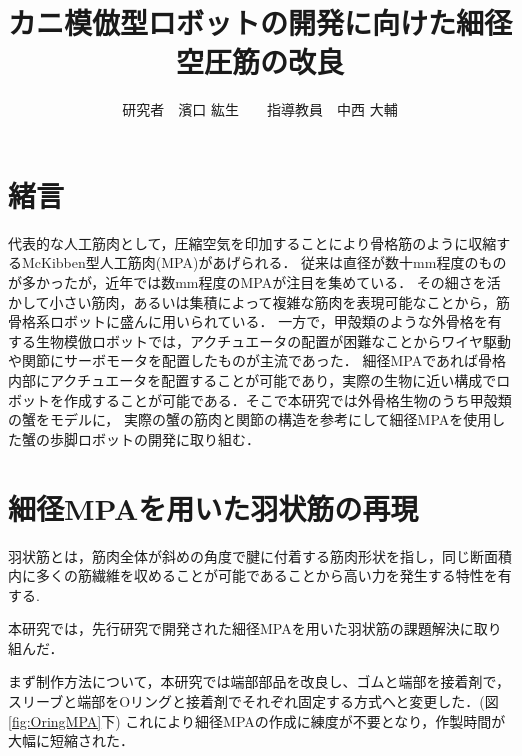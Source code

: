 \documentclass{jarticle}
\begin{document}

\title{
カニ模倣型ロボットの開発に向けた細径空圧筋の改良
}
\author{
\centering
研究者　濱口 紘生　　指導教員　中西 大輔
}

\maketitle

\thispagestyle{empty}  %

\section{緒言}

代表的な人工筋肉として，圧縮空気を印加することにより骨格筋のように収縮するMcKibben型人工筋肉(MPA)があげられる．
従来は直径が数十mm程度のものが多かったが，近年では数mm程度のMPAが注目を集めている\cite{wakimoto}．
その細さを活かして小さい筋肉，あるいは集積によって複雑な筋肉を表現可能なことから，筋骨格系ロボットに盛んに用いられている\cite{wakimoto}．
一方で，甲殻類のような外骨格を有する生物模倣ロボットでは，アクチュエータの配置が困難なことからワイヤ駆動や関節にサーボモータを配置したものが主流であった\cite{crabrobot1}．
細径MPAであれば骨格内部にアクチュエータを配置することが可能であり，実際の生物に近い構成でロボットを作成することが可能である．そこで本研究では外骨格生物のうち甲殻類の蟹をモデルに，
実際の蟹の筋肉と関節の構造を参考にして細径MPAを使用した蟹の歩脚ロボットの開発に取り組む．

\section{細径MPAを用いた羽状筋の再現}
羽状筋とは，筋肉全体が斜めの角度で腱に付着する筋肉形状を指し，同じ断面積内に多くの筋繊維を収めることが可能であることから高い力を発生する特性を有する.

本研究では，先行研究\cite{crabrobot2}で開発された細径MPAを用いた羽状筋の課題解決に取り組んだ．

まず制作方法について，本研究では端部部品を改良し、ゴムと端部を接着剤で，スリーブと端部をOリングと接着剤でそれぞれ固定する方式へと変更した．(図\ref{fig:OringMPA}下)
これにより細径MPAの作成に練度が不要となり，作製時間が大幅に短縮された．
\end{document}
